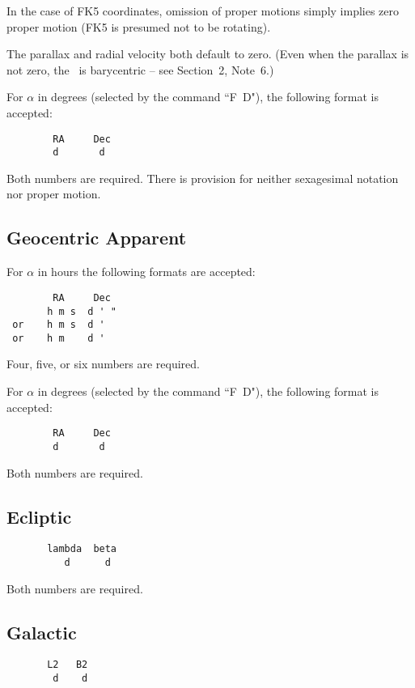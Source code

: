 In the case of FK5 coordinates, omission of proper motions
simply implies zero proper motion (FK5 is presumed not to
be rotating).

The parallax and radial velocity both default to zero.  (Even when the
parallax is not zero, the \radec\ is barycentric -- see Section~2, Note~6.)

For $\alpha$ in degrees (selected by the command ``F~D"), the
following format is accepted:
\begin{verbatim}
        RA     Dec
        d       d
\end{verbatim}

Both numbers are required.  There is provision for neither sexagesimal
notation nor proper motion.

\subsection{Geocentric Apparent}

For $\alpha$ in hours the following formats are accepted:
\begin{verbatim}
        RA     Dec
       h m s  d ' "
 or    h m s  d '
 or    h m    d '
\end{verbatim}

Four, five, or six numbers are required.

For $\alpha$ in degrees (selected by the command ``F~D"), the
following format is accepted:
\begin{verbatim}
        RA     Dec
        d       d
\end{verbatim}

Both numbers are required.

\subsection{Ecliptic}

\begin{verbatim} 
       lambda  beta
          d      d
\end{verbatim}

Both numbers are required.

\subsection{Galactic}

\begin{verbatim}
       L2   B2
        d    d
\end{verbatim}

